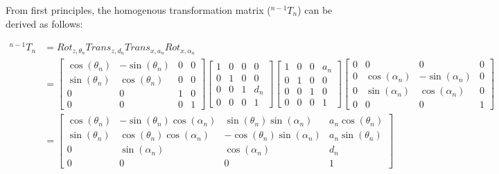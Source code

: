 \documentclass[12pt]{article}
\begin{document}
From first principles, the homogenous transformation matrix ($^{n-1}T_{n}$) can be derived as follows:

\begin{equation}
    \begin{split}
        ^{n-1}T_{n} & = Rot_{z, \theta_n} Trans_{z, d_n} Trans_{x, a_n} Rot_{x, \alpha_n}                                   \\
                    & = \begin{bmatrix}
                            \cos(\theta_n) & -\sin(\theta_n) & 0 & 0 \\
                            \sin(\theta_n) & \cos(\theta_n)  & 0 & 0 \\
                            0              & 0               & 1 & 0 \\
                            0              & 0               & 0 & 1
                        \end{bmatrix}
        \begin{bmatrix}
            1 & 0 & 0 & 0   \\
            0 & 1 & 0 & 0   \\
            0 & 0 & 1 & d_n \\
            0 & 0 & 0 & 1
        \end{bmatrix}
        \begin{bmatrix}
            1 & 0 & 0 & a_n \\
            0 & 1 & 0 & 0   \\
            0 & 0 & 1 & 0   \\
            0 & 0 & 0 & 1
        \end{bmatrix}
        \begin{bmatrix}
            0 & 0              & 0               & 0 \\
            0 & \cos(\alpha_n) & -\sin(\alpha_n) & 0 \\
            0 & \sin(\alpha_n) & \cos(\alpha_n)  & 0 \\
            0 & 0              & 0               & 1
        \end{bmatrix}                                                                            \\
                    & = \begin{bmatrix}
                            \cos(\theta_n) & -\sin(\theta_n)\cos(\alpha_n) & \sin(\theta_n)\sin(\alpha_n)  & a_n \cos(\theta_n) \\
                            \sin(\theta_n) & \cos(\theta_n)\cos(\alpha_n)  & -\cos(\theta_n)\sin(\alpha_n) & a_n \sin(\theta_n) \\
                            0              & \sin(\alpha_n)                & \cos(\alpha_n)                & d_n                \\
                            0              & 0                             & 0                             & 1
                        \end{bmatrix}
    \end{split}
    \label{equation:DH Matrix}
\end{equation}
\end{document}
